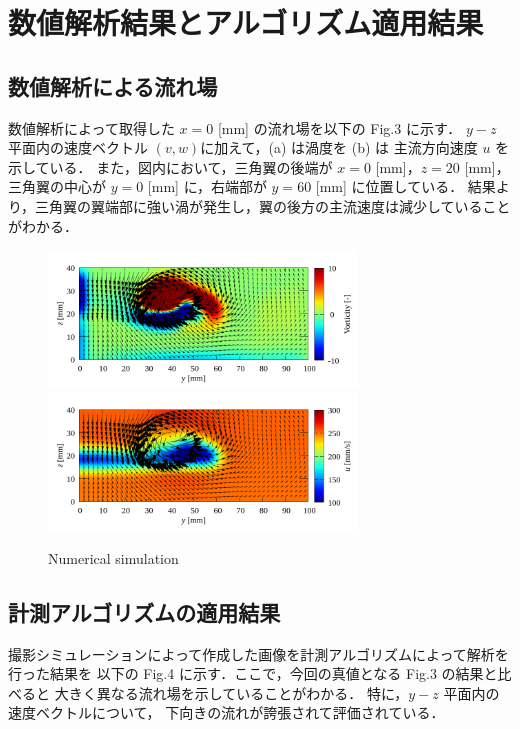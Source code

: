 \documentclass[twocolumn,a4j]{jsarticle}
\begin{document}
\section{数値解析結果とアルゴリズム適用結果}
\subsection{数値解析による流れ場}
数値解析によって取得した $x=0$ [mm] の流れ場を以下の Fig.3 に示す．
$y-z$ 平面内の速度ベクトル $(v,w)$に加えて，(a) は渦度を
(b) は 主流方向速度 $u$ を示している．
また，図内において，三角翼の後端が $x=0$ [mm]，$z=20$ [mm]，
三角翼の中心が $y=0$ [mm] に，右端部が $y=60$ [mm] に位置している．
結果より，三角翼の翼端部に強い渦が発生し，翼の後方の主流速度は減少していることがわかる．

\begin{figure}[htbp]
  \centering
  {
    \includegraphics[keepaspectratio, width=82mm]{../images/Numerical_Simulation/velocity_and_vorticity.png}
    \includegraphics[keepaspectratio, width=82mm]{../images/Numerical_Simulation/velocity_xyz.png}
  }
  \caption{Numerical simulation}
\end{figure}

\subsection{計測アルゴリズムの適用結果}
撮影シミュレーションによって作成した画像を計測アルゴリズムによって解析を行った結果を
以下の Fig.4 に示す．ここで，今回の真値となる Fig.3 の結果と比べると
大きく異なる流れ場を示していることがわかる．
特に，$y-z$ 平面内の速度ベクトルについて，
下向きの流れが誇張されて評価されている．
\end{document}
